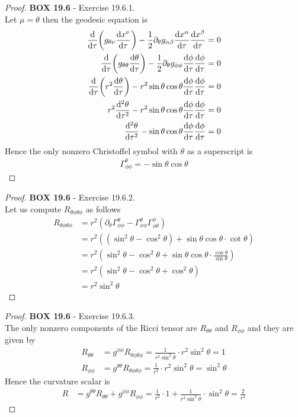 \documentclass[11pt]{article}
\theoremstyle{definition}
\begin{document}
\cleardoublepage
\begin{proof}{\textbf{BOX 19.6} - Exercise 19.6.1.}\\
Let $\mu = \theta$ then the geodesic equation is
\begin{align*}
    \dv{\tau}(g_{\theta \nu}\dv{x^\nu}{\tau})
    - \frac{1}{2}\partial_\theta g_{\alpha\beta}\dv{x^\alpha}{\tau}\dv{x^\beta}{\tau}
    &= 0\\
    \dv{\tau}(g_{\theta \theta}\dv{\theta}{\tau})
    - \frac{1}{2}\partial_\theta g_{\phi\phi}\dv{\phi}{\tau}\dv{\phi}{\tau}
    &= 0\\
    \dv{\tau}(r^2\dv{\theta}{\tau})
    - r^2\sin\theta\cos\theta\dv{\phi}{\tau}\dv{\phi}{\tau}
    &= 0\\
    r^2\dv[2]{\theta}{\tau}
    - r^2\sin\theta\cos\theta\dv{\phi}{\tau}\dv{\phi}{\tau}
    &= 0\\
    \dv[2]{\theta}{\tau}
    - \sin\theta\cos\theta\dv{\phi}{\tau}\dv{\phi}{\tau}
    &= 0
\end{align*}
Hence the only nonzero Christoffel symbol with $\theta$ as a superscript is
\begin{align*}
    \Gamma^\theta_{\phi\phi} = -\sin\theta\cos\theta
\end{align*}
\end{proof}
\begin{proof}{\textbf{BOX 19.6} - Exercise 19.6.2.}\\
Let us compute $R_{\theta\phi\theta\phi}$ as follows
\begin{align*}
    R_{\theta\phi\theta\phi}
    &= r^2(\partial_{\theta}\Gamma^\theta_{\phi\phi} - \Gamma^\theta_{\phi\phi}
    \Gamma^\phi_{\phi\theta})\\
    &= r^2((\sin^2\theta - \cos^2\theta) + \sin\theta\cos\theta\cdot \cot\theta)\\
    &= r^2(\sin^2\theta - \cos^2\theta
    + \sin\theta\cos\theta\cdot \frac{\cos\theta}{\sin\theta})\\
    &= r^2(\sin^2\theta - \cos^2\theta + \cos^2\theta)\\
    &= r^2\sin^2\theta
\end{align*}
\end{proof}
\begin{proof}{\textbf{BOX 19.6} - Exercise 19.6.3.}\\
The only nonzero components of the Ricci tensor are $R_{\theta\theta}$ and
$R_{\phi\phi}$ and they are given by
\begin{align*}
    R_{\theta\theta} &= g^{\phi\phi}R_{\theta\phi\theta\phi}
    = \frac{1}{r^2\sin^2\theta} \cdot r^2\sin^2\theta = 1\\
    R_{\phi\phi} &= g^{\theta\theta}R_{\theta\phi\theta\phi}
    = \frac{1}{r^2} \cdot r^2\sin^2\theta = \sin^2\theta
\end{align*}
Hence the curvature scalar is
\begin{align*}
    R &= g^{\theta\theta}R_{\theta\theta} + g^{\phi\phi}R_{\phi\phi}
    = \frac{1}{r^2}\cdot 1 + \frac{1}{r^2\sin^2\theta}\cdot\sin^2\theta
    = \frac{2}{r^2}
\end{align*}
\end{proof}
\end{document}
